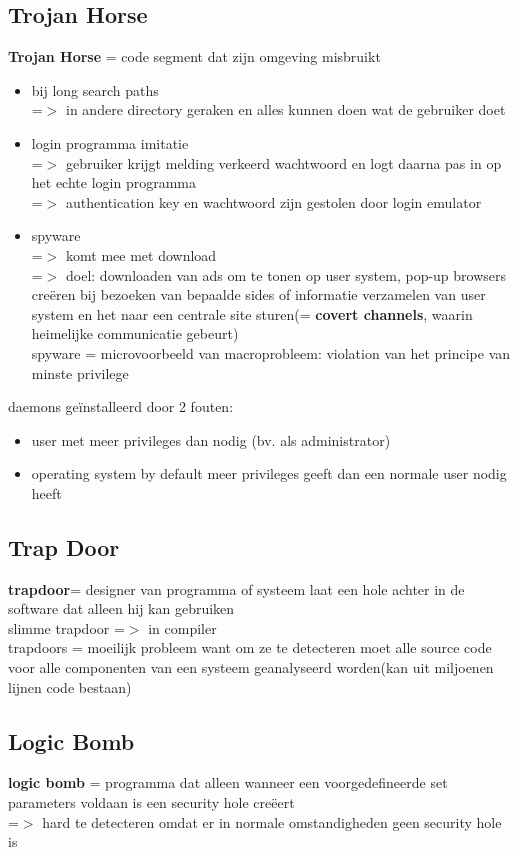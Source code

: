 \documentclass{report}
\begin{document}
\subsection{Trojan Horse}
\textbf{Trojan Horse} = code segment dat zijn omgeving misbruikt
\begin{itemize}
\item bij long search paths 
\\=$>$ in andere directory geraken en alles kunnen doen wat de gebruiker doet
\item login programma imitatie
\\=$>$ gebruiker krijgt melding verkeerd wachtwoord en logt daarna pas in op het echte login programma
\\=$>$ authentication key en wachtwoord zijn gestolen door login emulator
\item spyware
\\=$>$ komt mee met download
\\=$>$ doel: downloaden van ads om te tonen op user system, pop-up browsers cre\"eren bij bezoeken van bepaalde sides of informatie verzamelen van user system en het naar een centrale site sturen(= \textbf{covert channels}, waarin heimelijke communicatie gebeurt)
\\spyware = microvoorbeeld van macroprobleem: violation van het principe van minste privilege

\end{itemize}
daemons ge\"installeerd door 2 fouten:
\begin{itemize}
\item user met meer privileges dan nodig (bv. als administrator)
\item operating system by default meer privileges geeft dan een normale user nodig heeft
\end{itemize}
\subsection{Trap Door}
\textbf{trapdoor}= designer van programma of systeem laat een hole achter in de software dat alleen hij kan gebruiken
\\slimme trapdoor =$>$ in compiler
\\trapdoors = moeilijk probleem want om ze te detecteren moet alle source code voor alle componenten van een systeem geanalyseerd worden(kan uit miljoenen lijnen code bestaan)

\subsection{Logic Bomb}
\textbf{logic bomb} = programma dat alleen wanneer een voorgedefineerde set parameters voldaan is een security hole cre\"eert
\\=$>$ hard te detecteren omdat er in normale omstandigheden geen security hole is
\end{document}
